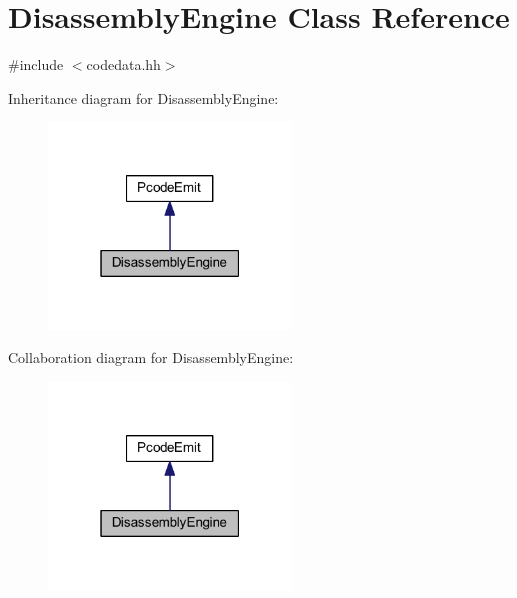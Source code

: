 \hypertarget{class_disassembly_engine}{}\section{Disassembly\+Engine Class Reference}
\label{class_disassembly_engine}


{\ttfamily \#include $<$codedata.\+hh$>$}



Inheritance diagram for Disassembly\+Engine\+:
\nopagebreak
\begin{figure}[H]
\begin{center}
\leavevmode
\includegraphics[width=183pt]{class_disassembly_engine__inherit__graph}
\end{center}
\end{figure}


Collaboration diagram for Disassembly\+Engine\+:
\nopagebreak
\begin{figure}[H]
\begin{center}
\leavevmode
\includegraphics[width=183pt]{class_disassembly_engine__coll__graph}
\end{center}
\end{figure}
